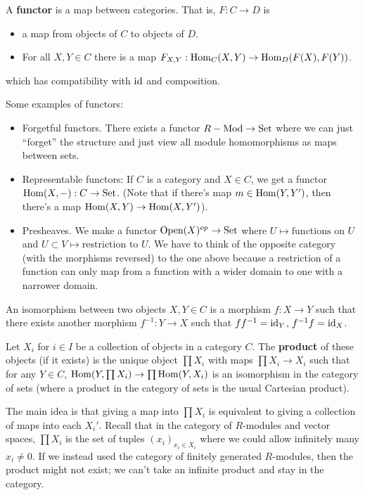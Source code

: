 \begin{definition}
    A \textbf{functor} is a map between categories. That is, $F: C \to D$ is
    \begin{itemize}
        \item a map from objects of $C$ to objects of $D$.
        \item For all $X, Y \in C$ there is a map $F_{X, Y}: \operatorname{Hom}_C(X, Y) \to \operatorname{Hom}_D(F(X), F(Y))$.
    \end{itemize}
    which has compatibility with $\operatorname{id}$ and composition.
\end{definition}

Some examples of functors:
\begin{itemize}
    \item Forgetful functors. There exists a functor $R-\textrm{Mod} \to \operatorname{Set}$ where we can just ``forget'' the structure
    and just view all module homomorphisms as maps between sets.
    \item Representable functors: If $C$ is a category and $X \in C$, we get a functor $\operatorname{Hom}(X, -): C \to \operatorname{Set}$. (Note that if there's map $m \in \operatorname{Hom}(Y, Y')$, then there's a map $\operatorname{Hom}(X, Y) \to \operatorname{Hom}(X, Y')$).
    \item Presheaves. We make a functor $\textrm{Open}(X)^{op} \to \operatorname{Set}$ where $U \mapsto \text{functions on }U$
    and $U \subset V \mapsto \text{restriction to } U$. We have to think of the opposite category (with the morphisms reversed) to the one above because a restriction of a function
    can only map from a function with a wider domain to one with a narrower domain.
\end{itemize}

\begin{definition}
    An isomorphism between two objects $X, Y \in C$ is a morphism $f: X \to Y$
    such that there exists another morphism $f^{-1}: Y \to X$ such that $ff^{-1} = \operatorname{id}_Y$, $f^{-1} f = \operatorname{id}_X$.
\end{definition}

\begin{definition}
Let $X_i$ for $i \in I$ be a collection of objects in a category $C$. The \textbf{product} of these objects (if it exists)
is the unique object $\prod X_i$ with maps $\prod X_i \to X_i$
such that for any $Y \in C$, $\operatorname{Hom}(Y, \prod X_i) \to \prod \operatorname{Hom}(Y, X_i)$ is an isomorphism in the category of sets (where a product
in the category of sets is the usual Cartesian product).
\end{definition}

The main idea is that giving a map into $\prod X_i$ is equivalent to giving a collection of maps
into each $X_i'$. Recall that in the category of $R$-modules and vector spaces,
$\prod X_i$ is the set of tuples $(x_i)_{x_i \in X_i}$ where we could allow infinitely many $x_i \neq 0$. If we instead
used the category of finitely generated $R$-modules, then the product might not exist; we can't take an infinite product and stay in
the category.

